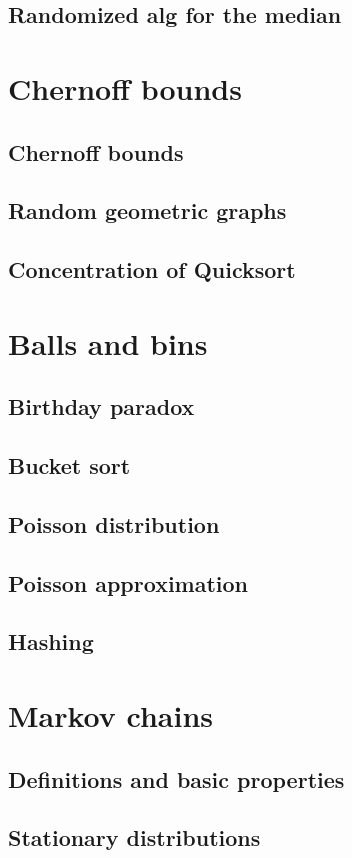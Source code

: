 \documentclass{book}
\begin{document}
\section{Randomized alg for the median}

\chapter{Chernoff bounds}
\section{Chernoff bounds}
\section{Random geometric graphs}
\section{Concentration of Quicksort}

\chapter{Balls and bins}
\section{Birthday paradox}
\section{Bucket sort}
\section{Poisson distribution} 
\section{Poisson approximation}
\section{Hashing}

\chapter{Markov chains}
\section{Definitions and basic properties}
\section{Stationary distributions}
\end{document}
